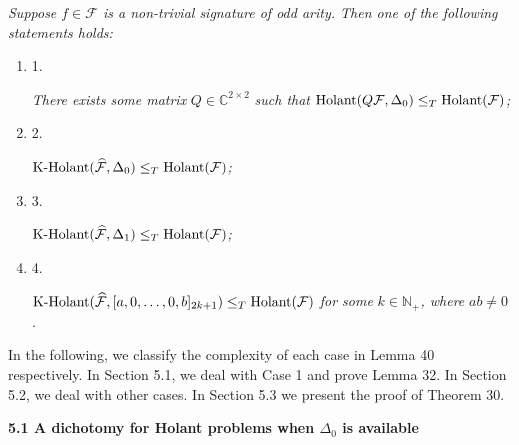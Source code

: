 \emph{Suppose $f\in\mathcal{F}$ is a non-trivial signature of odd arity. Then one of the following statements holds:}\par


\begin{enumerate}


\item[] 
1. 


\emph{There exists some matrix }$Q\in\mathbb{C}^{2\times 2}$\emph{ such that }$\textup{{Holant}}(Q\mathcal{F},\Delta_{0})\leq_{T}\textup{{Holant}}(\mathcal{F})$\emph{;}\par





\item[] 
2. 


$\textup{{K-Holant}}(\widehat{\mathcal{F}},\Delta_{0})\leq_{T}\textup{{Holant}}(\mathcal{F})$\emph{;}\par





\item[] 
3. 


$\textup{{K-Holant}}(\widehat{\mathcal{F}},\Delta_{1})\leq_{T}\textup{{Holant}}(\mathcal{F})$\emph{;}\par





\item[] 
4. 


$\textup{{K-Holant}}(\widehat{\mathcal{F}},[a,0,\dots,0,b]_{2k+1})\leq_{T}\textup{{Holant}}(\mathcal{F})$\emph{ for some }$k\in\mathbb{N}_{+}$\emph{, where }$ab\neq 0$\emph{.}\par





\end{enumerate}






In the following, we classify the complexity of each case in Lemma 40 respectively. In Section 5.1, we deal with Case 1 and prove Lemma 32. In Section 5.2, we deal with other cases. In Section 5.3 we present the proof of Theorem 30.\par




\par\medskip\noindent\textbf{
5.1 A dichotomy for Holant problems when $\Delta_{0}$ is available}\par




